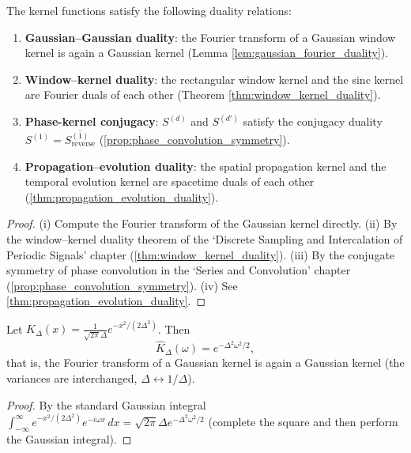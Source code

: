 \begin{property}\label{prop:kernel_duality}
The kernel functions satisfy the following duality relations:
\begin{enumerate}[label=(\roman*)]
    \item \textbf{Gaussian--Gaussian duality}: the Fourier transform of a Gaussian window kernel is again a Gaussian kernel (Lemma \ref{lem:gaussian_fourier_duality}).
    \item \textbf{Window--kernel duality}: the rectangular window kernel and the sinc kernel are Fourier duals of each other (Theorem \ref{thm:window_kernel_duality}).
    \item \textbf{Phase-kernel conjugacy}: $S^{(d)}$ and $S^{(d')}$ satisfy the conjugacy duality $S^{(1)} = \overline{S^{(1)}_{\text{reverse}}}$ (\cref{prop:phase_convolution_symmetry}).
    \item \textbf{Propagation--evolution duality}: the spatial propagation kernel and the temporal evolution kernel are spacetime duals of each other (\cref{thm:propagation_evolution_duality}).
\end{enumerate}
\end{property}

\begin{proof}
(i) Compute the Fourier transform of the Gaussian kernel directly. (ii) By the window--kernel duality theorem of the `Discrete Sampling and Intercalation of Periodic Signals' chapter (\cref{thm:window_kernel_duality}). (iii) By the conjugate symmetry of phase convolution in the `Series and Convolution' chapter (\cref{prop:phase_convolution_symmetry}). (iv) See \cref{thm:propagation_evolution_duality}.
\end{proof}

\begin{lemma}\label{lem:gaussian_fourier_duality}
Let $K_\Delta(x) = \frac{1}{\sqrt{2\pi}\Delta}e^{-x^2/(2\Delta^2)}$. Then
\[
\hat K_\Delta(\omega) = e^{-\Delta^2\omega^2/2},
\]
that is, the Fourier transform of a Gaussian kernel is again a Gaussian kernel (the variances are interchanged, $\Delta\leftrightarrow 1/\Delta$).
\end{lemma}

\begin{proof}
By the standard Gaussian integral $\int_{-\infty}^\infty e^{-x^2/(2\Delta^2)}e^{-i\omega x}\,dx = \sqrt{2\pi}\Delta e^{-\Delta^2\omega^2/2}$ (complete the square and then perform the Gaussian integral).
\end{proof}

